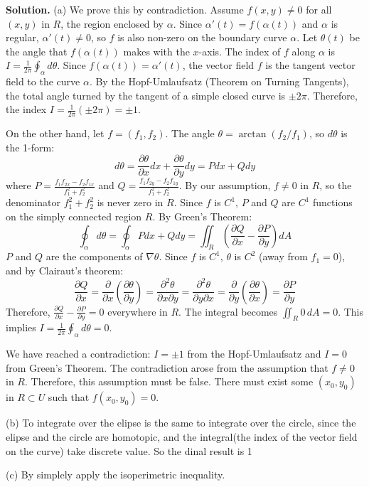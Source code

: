 \documentclass[12pt, a4paper, oneside]{article}
\newenvironment{solution}
  {\par\noindent\textbf{Solution. }\newline}
  {\par}
\begin{document}
\begin{solution}
(a) We prove this by contradiction.
Assume $f(x,y) \ne 0$ for all $(x,y)$ in $R$, the region enclosed by $\alpha$. Since $\alpha'(t) = f(\alpha(t))$ and $\alpha$ is regular, $\alpha'(t) \ne 0$, so $f$ is also non-zero on the boundary curve $\alpha$.
Let $\theta(t)$ be the angle that $f(\alpha(t))$ makes with the $x$-axis. The index of $f$ along $\alpha$ is $I = \frac{1}{2\pi} \oint_\alpha d\theta$.
Since $f(\alpha(t)) = \alpha'(t)$, the vector field $f$ is the tangent vector field to the curve $\alpha$. By the Hopf-Umlaufsatz (Theorem on Turning Tangents), the total angle turned by the tangent of a simple closed curve is $\pm 2\pi$.
Therefore, the index $I = \frac{1}{2\pi} (\pm 2\pi) = \pm 1$.

On the other hand, let $f = (f_1, f_2)$. The angle $\theta = \arctan(f_2/f_1)$, so $d\theta$ is the 1-form:
\[ d\theta = \frac{\partial \theta}{\partial x} dx + \frac{\partial \theta}{\partial y} dy = P dx + Q dy \text{} \]
where $P = \frac{f_1 f_{2x} - f_2 f_{1x}}{f_1^2+f_2^2}$ and $Q = \frac{f_1 f_{2y} - f_2 f_{1y}}{f_1^2+f_2^2}$.
By our assumption, $f \ne 0$ in $R$, so the denominator $f_1^2+f_2^2$ is never zero in $R$. Since $f$ is $C^1$, $P$ and $Q$ are $C^1$ functions on the simply connected region $R$.
By Green's Theorem:
\[ \oint_\alpha d\theta = \oint_\alpha P dx + Q dy = \iint_R \left(\frac{\partial Q}{\partial x} - \frac{\partial P}{\partial y}\right) dA \]
$P$ and $Q$ are the components of $\nabla \theta$. Since $f$ is $C^1$, $\theta$ is $C^2$ (away from $f_1=0$), and by Clairaut's theorem:
\[ \frac{\partial Q}{\partial x} = \frac{\partial}{\partial x}\left(\frac{\partial \theta}{\partial y}\right) = \frac{\partial^2 \theta}{\partial x \partial y} = \frac{\partial^2 \theta}{\partial y \partial x} = \frac{\partial}{\partial y}\left(\frac{\partial \theta}{\partial x}\right) = \frac{\partial P}{\partial y} \]
Therefore, $\frac{\partial Q}{\partial x} - \frac{\partial P}{\partial y} = 0$ everywhere in $R$.
The integral becomes $\iint_R 0 \, dA = 0$.
This implies $I = \frac{1}{2\pi} \oint_\alpha d\theta = 0$.

We have reached a contradiction: $I = \pm 1$ from the Hopf-Umlaufsatz and $I = 0$ from Green's Theorem.
The contradiction arose from the assumption that $f \ne 0$ in $R$.
Therefore, this assumption must be false. There must exist some $(x_0, y_0)$ in $R \subset U$ such that $f(x_0, y_0) = 0$.

(b) 
To integrate over the elipse is the same to integrate over the circle, since the elipse and the circle are homotopic, and the integral(the index of the vector field on the curve) take discrete value. So the dinal result is 1 

(c)
By simplely apply the isoperimetric inequality.
\end{solution}
\end{document}
